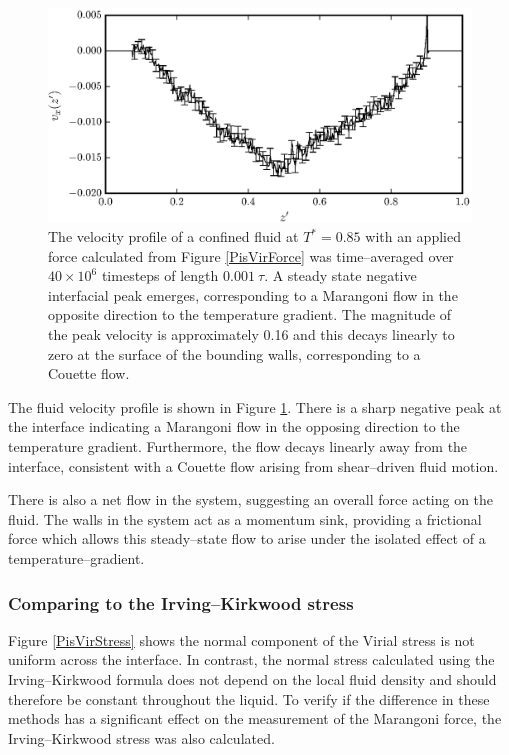 \begin{figure}[h]
\centering
\includegraphics[scale=1.0]{PisVirFlow}
\caption{The velocity profile of a confined fluid at $T^{*}=0.85$ with an applied force calculated from Figure \ref{PisVirForce} was time--averaged over $40 \times 10^{6}$ timesteps of length $0.001\ \tau$.
A steady state negative interfacial peak emerges, corresponding to a Marangoni flow in the opposite direction to the temperature gradient.
The magnitude of the peak velocity is approximately 0.16 and this decays linearly to zero at the surface of the bounding walls, corresponding to a Couette flow.}
\label{PisVirFlow}
\end{figure}
The fluid velocity profile is shown in Figure \ref{PisVirFlow}. 
There is a sharp negative peak at the interface indicating a Marangoni flow in the opposing direction to the temperature gradient.
Furthermore, the flow decays linearly away from the interface, consistent with a Couette flow arising from shear--driven fluid motion.\cite{FluidMech}

There is also a net flow in the system, suggesting an overall force acting on the fluid.
The walls in the system act as a momentum sink, providing a frictional force which allows this steady--state flow to arise under the isolated effect of a temperature--gradient.
\FloatBarrier

\subsubsection{Comparing to the Irving--Kirkwood stress}
Figure \ref{PisVirStress} shows the normal component of the Virial stress is not uniform across the interface.
In contrast, the normal stress calculated using the Irving--Kirkwood formula does not depend on the local fluid density and should therefore be constant throughout the liquid.
To verify if the difference in these methods has a significant effect on the measurement of the Marangoni force, the Irving--Kirkwood stress was also calculated.

